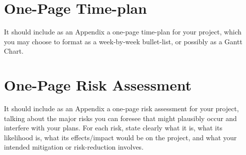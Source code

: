 \documentclass[ %
                    author={James Stephenson},
                supervisor={Dr. Edwin Simpson},
                    degree={MSc},
                     title={Project Plan: Bayesian Deep Learning For Extractive Test Summarisation},
                  subtitle={},
                      type={},
                      year={2022}]{../additions/dissertation}
\begin{document}
	
	\backmatter
	
	
	
	
	
	\appendix
	
	\chapter{One-Page Time-plan}
		\label{appx:timeplan}
		
		It should include as an Appendix a one-page time-plan for your project, which you may choose to format as a week-by-week bullet-list, or possibly as a Gantt Chart. 
		
	\chapter{One-Page Risk Assessment}
		\label{appx:riskassessment}
		
		It should include as an Appendix a one-page risk assessment for your project, talking about the major risks you can foresee that might plausibly occur and interfere with your plans. For each risk, state clearly what it is, what its likelihood is, what its effects/impact would be on the project, and what your intended mitigation or risk-reduction involves.
		
\end{document}
